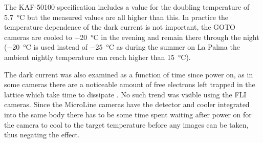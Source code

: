 \begin{colsection}
\begin{colsection}
The KAF-50100 specification includes a value for the doubling temperature of \SI{5.7}{\celsius} but the measured values are all higher than this. In practice the temperature dependence of the dark current is not important, the GOTO cameras are cooled to \SI{-20}{\celsius} in the evening and remain there through the night (\SI{-20}{\celsius} is used instead of \SI{-25}{\celsius} as during the summer on La Palma the ambient nightly temperature can reach higher than \SI{15}{\celsius}).

The dark current was also examined as a function of time since power on, as in some cameras there are a noticeable amount of free electrons left trapped in the lattice which take time to dissipate \citep{Liam}. No such trend was visible using the FLI cameras. Since the MicroLine cameras have the detector and cooler integrated into the same body there has to be some time spent waiting after power on for the camera to cool to the target temperature before any images can be taken, thus negating the effect.


\end{colsection}
\end{colsection}

